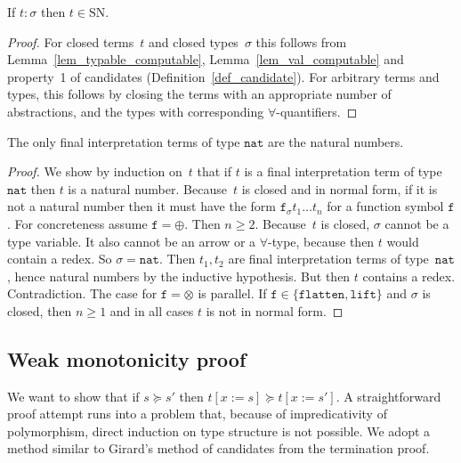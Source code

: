 \documentclass[a4paper,UKenglish,cleveref,autoref,numberwithinsect]{lipics-v2019}
\theoremstyle{definition}
\newcommand{\subst}[2]{#1:=#2}
\newcommand{\nat}{\mathtt{nat}}
\newcommand{\flatten}{\mathtt{flatten}}
\newcommand{\lift}{\mathtt{lift}}
\newcommand{\SN}{\mathrm{SN}}
\begin{document}
{ \renewcommand{\thetheorem}{\ref{thm_sn}}
\begin{theorem}
  If $t : \sigma$ then $t \in \SN$.
\end{theorem}
\addtocounter{theorem}{-1}}

\begin{proof}
  For closed terms~$t$ and closed types~$\sigma$ this follows from
  Lemma~\ref{lem_typable_computable}, Lemma~\ref{lem_val_computable}
  and property~1 of candidates (Definition~\ref{def_candidate}). For
  arbitrary terms and types, this follows by closing the terms with an
  appropriate number of abstractions, and the types with corresponding
  $\forall$-quantifiers.
\end{proof}

{ \renewcommand{\thelemma}{\ref{lem_final_nat}}
\begin{lemma}
  The only final interpretation terms of type $\nat$ are the natural
  numbers.
\end{lemma}
\addtocounter{theorem}{-1}}

\begin{proof}
  We show by induction on~$t$ that if $t$ is a final interpretation
  term of type~$\nat$ then $t$ is a natural number. Because~$t$ is
  closed and in normal form, if it is not a natural number then it
  must have the form $\mathtt{f}_\sigma t_1 \ldots t_n$ for a function
  symbol $\mathtt{f}$. For concreteness assume $\mathtt{f} =
  \oplus$. Then $n \ge 2$. Because~$t$ is closed, $\sigma$ cannot be a
  type variable. It also cannot be an arrow or a $\forall$-type,
  because then $t$ would contain a redex. So $\sigma=\nat$. Then
  $t_1,t_2$ are final interpretation terms of type~$\nat$, hence
  natural numbers by the inductive hypothesis. But then $t$ contains a
  redex. Contradiction.
  The case for $\mathtt{f} = \otimes$ is parallel.  If
  $\mathtt{f} \in \{\flatten,\lift\}$ and $\sigma$ is closed, then
  $n \ge 1$ and in all cases $t$ is not in normal form.
\end{proof}

\subsection{Weak monotonicity proof}\label{sec_weakly_monotone_proof}

We want to show that if $s \succeq s'$ then $t[\subst{x}{s}] \succeq
t[\subst{x}{s'}]$. A straightforward proof attempt runs into a problem
that, because of impredicativity of polymorphism, direct induction on
type structure is not possible. We adopt a method similar to Girard's
method of candidates from the termination proof.
\end{document}
